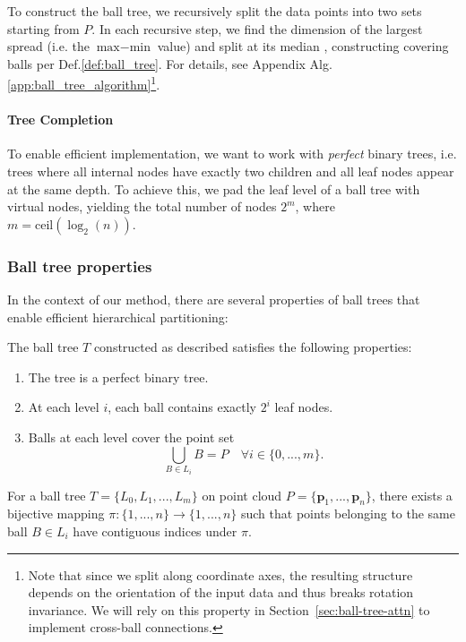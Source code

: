To construct the ball tree, we recursively split the data points into two sets starting from $P$. In each recursive step, we find the dimension of the largest spread (i.e. the $\text{max}-\text{min}$ value) and split at its median \cite{Pedregosa2011ScikitlearnML}, constructing covering balls per Def.\ref{def:ball_tree}. For details, see Appendix Alg.\ref{app:ball_tree_algorithm}\footnote{Note that since we split along coordinate axes, the resulting structure depends on the orientation of the input data and thus breaks rotation invariance. We will rely on this property in Section~\ref{sec:ball-tree-attn} to implement cross-ball connections.}.

\paragraph{Tree Completion}
To enable efficient implementation, we want to work with \emph{perfect} binary trees, i.e. trees where all internal nodes have exactly two children and all leaf nodes appear at the same depth. To achieve this, we pad the leaf level of a ball tree with virtual nodes, yielding the total number of nodes $2^m$, where $m = \text{ceil}(\log_2(n))$.
\subsubsection{Ball tree properties}
In the context of our method, there are several properties of ball trees that enable efficient hierarchical partitioning:
\begin{proposition}
\label{proposition:ball_tree_properties}
The ball tree $T$ constructed as described satisfies the following properties:
\vspace{-10pt}
\begin{enumerate}[itemsep=0.5ex]
   \item The tree is a perfect binary tree.
   \item At each level $i$, each ball contains exactly $2^i$ leaf nodes.
   \item Balls at each level cover the point set
   \begin{equation*}
       \bigcup_{B \in L_i} B = P \quad \forall i \in \{0, ..., m\}.
   \end{equation*}
\end{enumerate}
\end{proposition}
\begin{proposition}
For a ball tree $T = \{L_0, L_1, ..., L_m\}$ on point cloud $P = \{\mathbf{p}_1, ..., \mathbf{p}_n\}$, there exists a bijective mapping $\pi: \{1,...,n\} \rightarrow \{1,...,n\}$ such that points belonging to the same ball $B \in L_i$ have contiguous indices under $\pi$.
\end{proposition}

